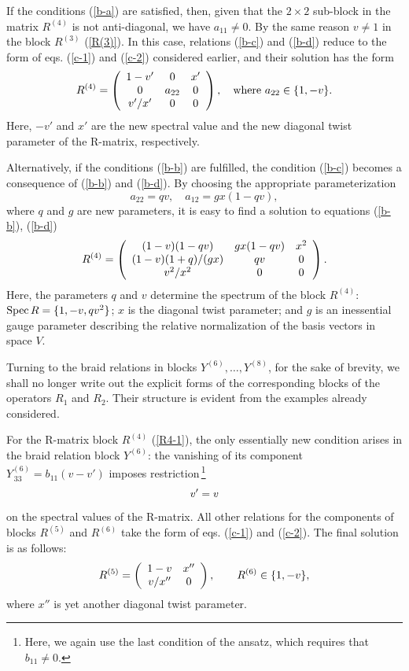 \documentclass[11pt]{article}
\def\be{\begin{equation}}\def\ee{\end{equation}}
\begin{document}
If the conditions (\ref{b-a}) are satisfied,
then, given that the $2\times 2$ sub-block in the matrix $R^{(4)}$ is not anti-diagonal,
we have $a_{11}\neq 0$. By the same reason $v\neq 1$ in the block $R^{(3)}$ (\ref{R(3)}).
In this case, relations (\ref{b-c}) and (\ref{b-d}) reduce to the form of eqs. (\ref{c-1}) and (\ref{c-2}) considered earlier, and their solution has the form
\be
\lb{R4-1}
R^{(4)} =\left(
\begin{array}{ccc}
1-v' &	0 & x'
	\\
	0 & 	a_{22} & 0
	\\
	v'/x' & 0& 0
\end{array}\right),\quad \mbox{where $a_{22}\in \{1,-v\}$}.
\ee
Here, $-v'$ and $x'$ are the new spectral value and the new diagonal twist parameter of the R-matrix, respectively.\smallskip   


Alternatively, if the conditions (\ref{b-b}) are fulfilled, the condition (\ref{b-c}) becomes a consequence of (\ref{b-b}) and (\ref{b-d}). By choosing the appropriate parameterization
$$
a_{22} = q v, \quad a_{12}= g x (1-q v),
$$
where $q$ and $g$ are new parameters, it is easy to find a solution to equations (\ref{b-b}), (\ref{b-d})
\be
\lb{R4-2}
R^{(4)} =\left(
\begin{array}{ccc}
	(1-v)(1-qv) &	g x(1-q v) & x^2
	\\
	(1-v)(1+q)/(g x) & 	q v & 0
	\\
	v^2/x^2 & 0& 0
\end{array}\right).
\ee
Here, the parameters $q$ and $v$ determine the spectrum of the block $R^{(4)}$: ${\rm Spec}\, R =\{1,-v,qv^2\}$; $x$ is the diagonal twist parameter; and $g$ is an inessential gauge parameter describing the relative normalization of the basis vectors in space $V$.
\smallskip

Turning to the braid relations in blocks $Y^{(6)}, \dots ,Y^{(8)}$, for the sake of brevity, we shall no longer write out the explicit forms of the corresponding blocks of the operators $R_1$ and $R_2$. Their structure is evident from the examples already considered.

For the R-matrix block $R^{(4)}$ (\ref{R4-1}), the only essentially new condition arises in the braid relation block $Y^{(6)}$: the vanishing of its component $Y^{(6)}_{\,33}=b_{11}(v-v')$ imposes restriction\,\footnote{Here, we again use the last condition of the ansatz, which requires that $b_{11} \neq 0$.} 
\be 
\lb{v-v}
v'=v
\ee
on the spectral values of the R-matrix. 
All other relations for the components of blocks $R^{(5)}$ and $R^{(6)}$ take the form of eqs. (\ref{c-1}) and (\ref{c-2}). The final solution is as follows:
\be 
\lb{R56-a}
R^{(5)} =\left(
\begin{array}{cc}
	1-v &	x''
	\\
	v/x'' & 	 0
\end{array}\right), \qquad
R^{(6)} \in \{1,-v\},
\ee
where $x''$ is yet another diagonal twist parameter.\smallskip
\end{document}
